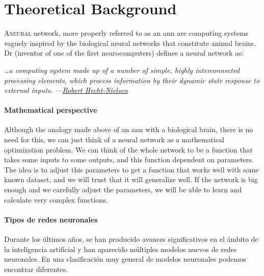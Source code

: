 

\chapter{Theoretical Background}



\lettrine{A}{neural} network, more properly referred to as an \gls{ann} are
computing systems vaguely inspired by the biological neural networks that
constitute animal brains. Dr
 (inventor of one of the first neurocomputers) defines a neural
network as:

\begin{quoteBox}
  \itshape
  \ldots a computing system made up of a number of simple, highly interconnected
  processing elements, which process information by their dynamic state response
  to external inputs.
  \tcblower
  \hfill \upshape
  ---\href{https://en.wikipedia.org/wiki/Robert_Hecht-Nielsen}
  {Robert Hecht-Nielsen}
\end{quoteBox}

\subsubsection{Mathematical perspective}
Although the analogy made above of an \gls{ann} with a biological brain, there
is no need for this, we can just think of a neural network as a mathematical
optimization problem. We can think of the whole network to be a function that
takes some inputs to some outputs, and this function dependent on
parameters. The idea is to adjust this parameters to get a function that works
well with some known dataset, and we will trust that it will generalize
well. If the network is big enough and we carefully adjust the parameters, we
will be able to learn and calculate very complex functions.

\subsubsection{Tipos de redes neuronales}
Durante los últimos años, se han producido avances significativos en el ámbito
de la inteligencia artificial y han aparecido múltiples modelos nuevos de redes
neuronales. En una clasificación muy general de modelos neuronales podemos
encontrar diferentes.


